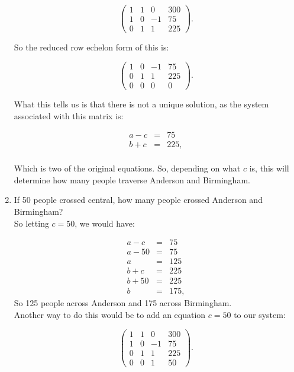 \begin{example}
\begin{enumerate}
    $$ \left( \begin{array}{rrr|r}
1 & 1 & 0& 300\\
1 & 0 & -1 & 75\\
0 & 1 & 1 & 225
\end{array}\right).$$
    
So the reduced row echelon form of this is:

    $$ \left( \begin{array}{rrr|r}
1 & 0 & -1 & 75\\
0 & 1 & 1 & 225\\
0 & 0 & 0& 0
\end{array}\right).$$

What this tells us is that there is not a unique solution, as the system associated with this matrix is:

    \begin{eqnarray*}
    a-c&=&75\\
    b+c&=&225,\\
    \end{eqnarray*}

Which is two of the original equations.  So, depending on what $c$ is, this will determine how many people traverse Anderson and Birmingham.

\item If 50 people crossed central, how many people crossed Anderson and Birmingham?\\

So letting $c=50$, we would have:

    \begin{eqnarray*}
    a-c&=&75\\
    a-50&=&75\\
    a&=&125\\
    b+c&=&225\\
    b+50&=&225\\
    b&=&175,
    \end{eqnarray*}
So 125 people across Anderson and 175 across Birmingham.\\

Another way to do this would be to add an equation $c=50$ to our system:

$$ \left( \begin{array}{rrr|r}
1 & 1 & 0& 300\\
1 & 0 & -1 & 75\\
0 & 1 & 1 & 225\\
0 & 0 & 1 & 50
\end{array}\right).$$
    

\end{enumerate}
\end{example}
